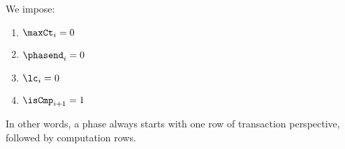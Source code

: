 \begin{center}
\end{center}

We impose:
\begin{enumerate}
	\item $\maxCt_{i} = 0$  
	\item $\phasend_{i} = 0$
	\item $\lc_{i} = 0$ 
	\item $\isCmp_{i+1} = 1$
\end{enumerate}

In other words, a phase always starts with one row of transaction perspective, followed by computation rows.
